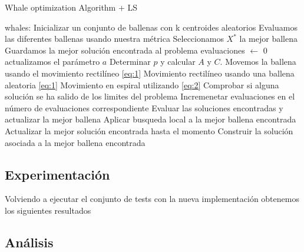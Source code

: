 \documentclass[11pt]{article}
\begin{document}
\begin{algorithm}[H]
  \caption{Whale optimization Algorithm + LS}
  \label{alg-lsearch}
  \begin{algorithmic}[1]
    \State whales: Inicializar un conjunto de ballenas con k centroides aleatorios
    \State Evaluamos las diferentes ballenas usando nuestra métrica 
    \State Seleccionamos $X^*$ la mejor ballena
    \State Guardamos la mejor solución encontrada al problema
    \State evaluaciones $\leftarrow$ 0
    \State actualizamos el parámetro $a$
    \State Determinar $p$ y calcular  $A$ y $C$.
    \State Movemos la ballena usando el movimiento rectilíneo \eqref{eq:1}
    \State Movimiento rectilíneo usando una ballena aleatoria \eqref{eq:1}
    \EndIf
    \Else
    \State Movimiento en espiral utilizando \eqref{eq:2}
    \EndIf
    \EndFor 
    \State Comprobar si alguna solución se ha salido de los limites del problema
    \State Incremenetar evaluaciones en el número de evaluaciones correspondiente
    \State Evaluar las soluciones encontradas y actualizar la mejor ballena 
    \State Aplicar busqueda local a la mejor ballena encontrada
    \State Actualizar la mejor solución encontrada hasta el momento
    \EndIf
    \EndWhile
    \State
    \Return Construir la solución asociada a la mejor ballena encontrada
    \EndProcedure
  \end{algorithmic}
\end{algorithm}

\subsection{Experimentación}

Volviendo a ejecutar el conjunto de tests con la nueva implementación obtenemos
los siguientes resultados




\subsection{Análisis}
\end{document}
